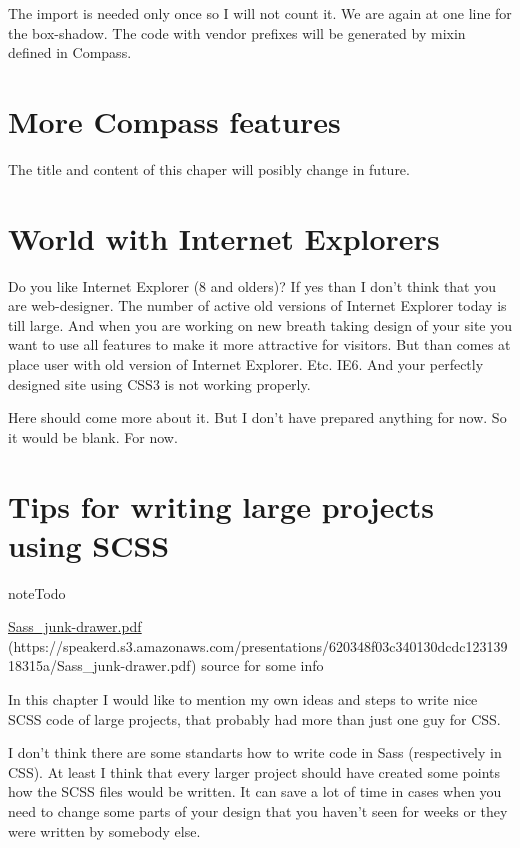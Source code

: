 \documentclass[a4paper,12pt,oneside]{sphinxmanual}
\begin{document}
The import is needed only once so I will not count it. We are again at one line for the box-shadow. The code with vendor prefixes will be generated by mixin defined in Compass.


\chapter{More Compass features}
\label{src/compass_utilities:more-compass-features}\label{src/compass_utilities::doc}
The title and content of this chaper will posibly change in future.


\chapter{World with Internet Explorers}
\label{src/compass_pie:world-with-internet-explorers}\label{src/compass_pie::doc}
Do you like Internet Explorer (8 and olders)? If yes than I don't think that you are web-designer. The number of active old versions of Internet Explorer today is till large. And when you are working on new breath taking design of your site you want to use all features to make it more attractive for visitors. But than comes at place user with old version of Internet Explorer. Etc. IE6. And your perfectly designed site using CSS3 is not working properly.

Here should come more about it. But I don't have prepared anything for now. So it would be blank. For now.


\chapter{Tips for writing large projects using SCSS}
\label{src/cookbook_tips::doc}\label{src/cookbook_tips:tips-for-writing-large-projects-using-scss}
\begin{notice}{note}{Todo}

\href{https://speakerd.s3.amazonaws.com/presentations/620348f03c340130dcdc12313918315a/Sass\_junk-drawer.pdf}{Sass\_junk-drawer.pdf} (https://speakerd.s3.amazonaws.com/presentations/620348f03c340130dcdc12313918315a/Sass\_junk-drawer.pdf) source for some info
\end{notice}

In this chapter I would like to mention my own ideas and steps to write nice SCSS code of large projects, that probably had more than just one guy for CSS.

I don't think there are some standarts how to write code in Sass (respectively in CSS). At least I think that every larger project should have created some points how the SCSS files would be written. It can save a lot of time in cases when you need to change some parts of your design that you haven't seen for weeks or they were written by somebody else.
\end{document}
